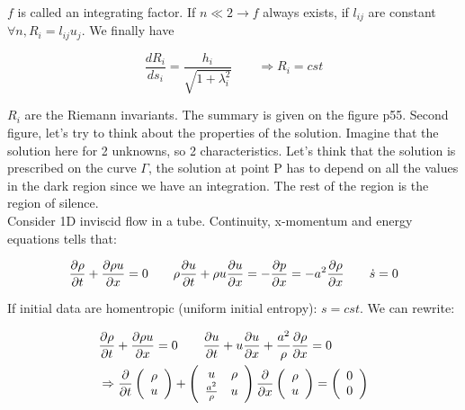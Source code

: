 $f$ is called an integrating factor. If $n\ll 2\rightarrow f$ always exists, if $l_{ij}$ are constant $\forall n, R_i = l_{ij} u_j$. We finally have 

\begin{equation}
\frac{d R_i}{ds_i} = \frac{h_i}{\sqrt{1+\lambda ^2_i}} \qquad \Rightarrow R_i = cst
\end{equation}

$R_i$ are the Riemann invariants. The summary is given on the figure p55. Second figure, let's try to think about the properties of the solution. Imagine that the solution here for 2 unknowns, so 2 characteristics. Let's think that the solution is prescribed on the curve $\Gamma$, the solution at point P has to depend on all the values in the dark region since we have an integration. The rest of the region is the region of silence. \\

Consider 1D inviscid flow in a tube. Continuity, x-momentum and energy equations tells that: 

\begin{equation}
\frac{\partial \rho}{\partial t} + \frac{\partial \rho u}{\partial x} = 0 \qquad \rho \frac{\partial u}{\partial t} + \rho u \frac{\partial u }{\partial x} = - \frac{\partial p}{\partial x}= -a^2\frac{\partial \rho}{\partial x} \qquad \dot{s} = 0
\end{equation}

If initial data are homentropic (uniform initial entropy): $s = cst$. We can rewrite: 

\begin{equation}
\begin{aligned}
&\frac{\partial \rho}{\partial t} + \frac{\partial \rho u}{\partial x} = 0 \qquad \frac{\partial u}{\partial t} + u \frac{\partial u }{\partial x} + \frac{a^2}{\rho} \frac{\partial \rho}{\partial x} = 0\\
&\Rightarrow \frac{\partial }{\partial t} \left( 
\begin{array}{c}
\rho \\
u
\end{array}
\right) + \left( 
\begin{array}{cc}
u & \rho\\
\frac{a^2}{\rho} & u
\end{array}
\right) 
\frac{\partial}{\partial x} \left( 
\begin{array}{c}
\rho \\
u
\end{array}
\right) 
=
\left( 
\begin{array}{c}
0 \\
0
\end{array}
\right) 
\end{aligned}
\end{equation}

